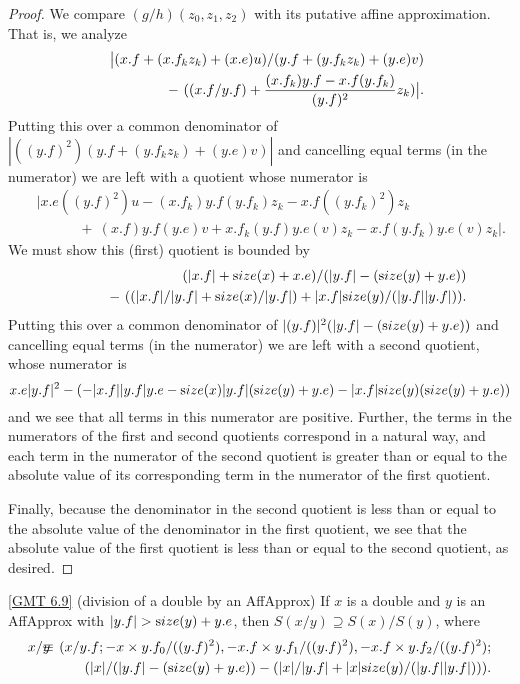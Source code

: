 {\begin{proof}{}
We compare $(g/h)(z_0, z_1, z_2)$ with its putative affine approximation.  That is, we analyze
\begin{eqnarray*}
&&\big|(x.f + (x.f_k z_k) + (x.e) u)/(y.f + (y.f_k z_k) + (y.e) v)\\
&&\qquad\quad - \
((x.f / y.f) + {(x.f_k) y.f - x.f (y.f_k) \over (y.f)^2} z_k)\big|
          . \end{eqnarray*}
Putting this over a common denominator  of 
$|((y.f)^2)(y.f + (y.f_k z_k) + (y.e) v)|$
and cancelling equal terms (in the numerator) we are left with a quotient whose numerator is 
\begin{eqnarray*} &&
|x.e ((y.f)^2) u - (x.f_k) y.f (y.f_k) z_k - x.f ((y.f_k)^2) z_k\\
&&\qquad\quad  + \
(x.f) y.f (y.e) v + x.f_k (y.f) y.e (v) z_k - x.f (y.f_k) y.e (v) z_k|.              
\end{eqnarray*}
We must show this (first) quotient is bounded by
\begin{eqnarray*}
&&
(|x.f| + {\textrm size}(x) + x.e) /(|y.f| - ({\textrm size}(y) + y.e)) \\
&&\qquad\quad - \
((|x.f|/|y.f| + {\textrm size}(x)/|y.f|) + |x.f| {\textrm size}(y)/(|y.f||y.f|)).        
\end{eqnarray*}
Putting this over a common denominator of 
$|(y.f)|^2 (|y.f| - ({\textrm size}(y) + y.e))$ 
and cancelling equal terms (in the numerator) we are left with a second quotient, whose numerator is 
$$x.e |y.f|^2 - (-|x.f| |y.f| y.e - {\textrm size}(x) |y.f| ({\textrm size}(y) + y.e) -
|x.f| {\textrm size}(y) ({\textrm size}(y) + y.e))$$
and we see that all terms in this numerator are positive.
Further, the terms in the numerators of the first and second quotients correspond in a natural way, and each term in the numerator of the second quotient  is greater than or equal to the absolute value of its corresponding term in the numerator of the first quotient.  

Finally,
 because the denominator in the second quotient is less than or equal to the absolute value of the denominator in the first quotient, we
see that the absolute value of the first quotient is less than or equal to the second quotient, as desired. \end{proof}

\begin{proposition}{\ref{GMT 6.9} {\textrm (division of a double by an AffApprox)}} If $x$ is a double and $y$ is an {\textrm AffApprox }
 with $|y.f| > {\textrm size}(y) + y.e${\textrm ,} then $S(x / y) \supseteq S(x) / S(y)${\textrm ,} where
\begin{eqnarray*}
x / y &\hskip-8pt\equiv\hskip-8pt& (x / y.f; -x \times y.f_0 /((y.f)^2), 
-x.f \times y.f_1 /((y.f)^2), -x.f \times y.f_2 /((y.f)^2); 
\\
&\hskip-8pt\hskip-8pt&\qquad (|x|  /(|y.f| - ({\textrm size}(y) + y.e)) - 
(|x|/|y.f|  + |x| {\textrm size}(y)/(|y.f||y.f|))).
                                              \end{eqnarray*}
\end{proposition}


}
